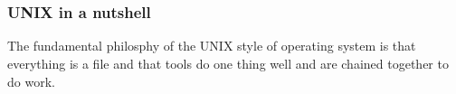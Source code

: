 \chapter[Introduction]{}

\subsection{UNIX in a nutshell}

The fundamental philosphy of the UNIX style of operating system is that everything is a file and that tools do one thing well and are chained together to do work.


